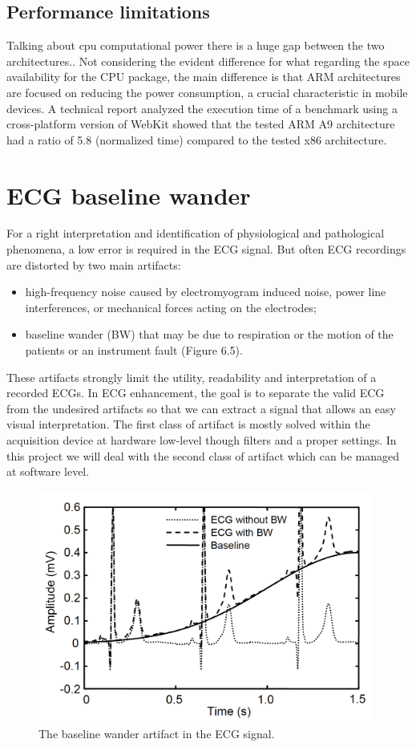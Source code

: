 \subsection{Performance limitations}
Talking about cpu computational power there is a huge gap between the two architectures.. Not considering the evident difference for what regarding the space availability for the CPU package, the main difference is that ARM architectures are focused on reducing the power consumption, a crucial characteristic in mobile devices. A technical report analyzed the execution time of a benchmark using a cross-platform version of WebKit showed that the tested ARM A9 architecture had a ratio of 5.8 (normalized time) compared to the tested x86 architecture.\cite{ref11}

\section{ECG baseline wander}
For a right interpretation and identification of physiological and pathological phenomena, a low error is required in the ECG signal. But often ECG recordings are distorted by two main artifacts:
\begin{itemize}
	\item high-frequency noise caused by electromyogram induced noise, power line interferences, or mechanical forces acting on the electrodes;
	\item baseline wander (BW) that may be due to respiration or the motion of the patients or an instrument fault (Figure 6.5).
\end{itemize}
These artifacts strongly limit the utility, readability and interpretation of a recorded ECGs. In ECG enhancement, the goal is to separate the valid ECG from the undesired artifacts so that we can extract a signal that allows an easy visual interpretation.\cite{ref12}
The first class of artifact is mostly solved within the acquisition device at hardware low-level though filters and a proper settings. In this project we will deal with the second class of artifact which can be managed at software level.
\begin{figure}[ht!]
	\centering
	\includegraphics[width=110mm]{figures/ch6/5.png}
	\caption{The baseline wander artifact in the ECG signal.}
	\label{fig6.5}
\end{figure}

